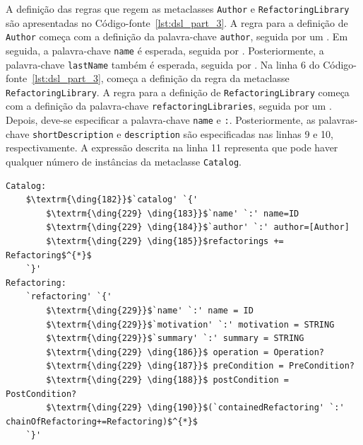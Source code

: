 A definição das regras que regem as metaclasses \texttt{Author} e \texttt{RefactoringLibrary} são apresentadas no Código-fonte~\ref{lst:dsl_part_3}. A regra para a definição de \texttt{Author} começa com a definição da palavra-chave \texttt{author}, seguida por um \aspas{\{}. Em seguida, a palavra-chave \texttt{name} é esperada, seguida por \aspas{\texttt{:}} . Posteriormente, a palavra-chave \texttt{lastName} também é esperada, seguida por \aspas{\texttt{:}} . Na linha 6 do Código-fonte~\ref{lst:dsl_part_3}, começa a definição da regra da metaclasse \texttt{RefactoringLibrary}. A regra para a definição de \texttt{RefactoringLibrary} começa com a definição da palavra-chave \texttt{refactoringLibraries}, seguida por um \aspas{\{}. Depois, deve-se especificar a palavra-chave \texttt{name} e \texttt{:}. Posteriormente, as palavras-chave \texttt{shortDescription} e \texttt{description} são especificadas nas linhas 9 e 10, respectivamente. A expressão descrita na linha 11 representa que pode haver qualquer número de instâncias da metaclasse \texttt{Catalog}.

\begin{lstlisting}[language=Xtext, frame=single, basicstyle=\scriptsize, mathescape=true, label={lst:dsl_part_4}, caption={Gramática da DSL - parte 4}]
Catalog:
	$\textrm{\ding{182}}$`catalog' `{' 
		$\textrm{\ding{229} \ding{183}}$`name' `:' name=ID
		$\textrm{\ding{229} \ding{184}}$`author' `:' author=[Author]
		$\textrm{\ding{229} \ding{185}}$refactorings += Refactoring$^{*}$
	`}'
Refactoring:
	`refactoring' `{' 
		$\textrm{\ding{229}}$`name' `:' name = ID
		$\textrm{\ding{229}}$`motivation' `:' motivation = STRING
		$\textrm{\ding{229}}$`summary' `:' summary = STRING
		$\textrm{\ding{229} \ding{186}}$ operation = Operation?
		$\textrm{\ding{229} \ding{187}}$ preCondition = PreCondition?
		$\textrm{\ding{229} \ding{188}}$ postCondition = PostCondition?
		$\textrm{\ding{229} \ding{190}}$(`containedRefactoring' `:' chainOfRefactoring+=Refactoring)$^{*}$
	`}'
\end{lstlisting}

